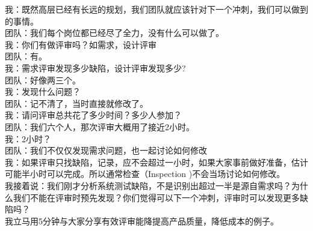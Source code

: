 
我：既然高层已经有长远的规划，我们团队就应该针对下一个冲刺，我们可以做到的事情。\\
团队：我们每个岗位都已经尽了全力，没有什么可以做了。\\
我：你们有做评审吗？如需求，设计评审\\
团队：有。\\
我：需求评审发现多少缺陷，设计评审发现多少?\\
团队：好像两三个。\\
我：发现什么问题？\\
团队：记不清了，当时直接就修改了。\\
我：请问评审总共花了多少时间？多少人参加？\\
团队：我们六个人，那次评审大概用了接近2小时。\\
我：2小时？\\
团队：我们不仅仅发现需求问题，也一起讨论如何修改\\
我：如果评审只找缺陷，记录，应不会超过一小时，如果大家事前做好准备，估计可能半小时可以完成。所以通常检查（Inspection
)不会当场讨论如何修改。\\
我接着说：我们刚才分析系统测试缺陷，不是识别出超过一半是源自需求吗？为什么我们不能在评审时预先发现？你们觉得可以下一个冲刺，评审时可以发现更多缺陷吗？\\
我立马用5分钟与大家分享有效评审能降提高产品质量，降低成本的例子。

